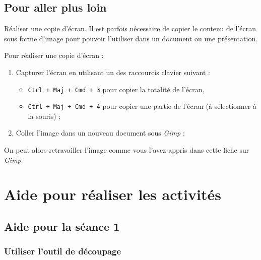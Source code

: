 \subsection{Pour aller plus loin}\label{CaptureEcran}

Réaliser une copie d'écran. Il est parfois nécessaire de copier le contenu de l'écran sous forme d'image pour pouvoir l'utiliser dans un document ou une présentation.

\vspace{12pt}

Pour réaliser une copie d'écran :

\begin{enumerate}
\item Capturer l'écran en utilisant un des raccourcis clavier suivant :
        \begin{itemize}
        \item \texttt{Ctrl + Maj + Cmd + 3} pour copier la totalité de l'écran,
        \item \texttt{Ctrl + Maj + Cmd + 4} pour copier une partie de l'écran (à sélectionner à la souris) ;
        \end{itemize} 


\item Coller l'image dans un nouveau document sous \emph{Gimp} : 
\end{enumerate}


On peut alors retravailler l'image comme vous l'avez appris dans cette fiche sur \emph{Gimp}. 





\newpage

\section{Aide pour réaliser les activités}

\subsection{Aide pour la séance 1}


\subsubsection{Utiliser l'outil de découpage}\label{correction_gimp01}

